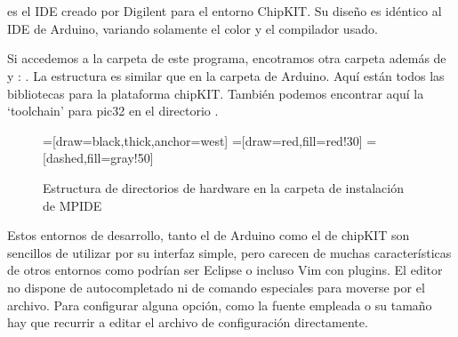 \section{}
\cite{website:mpide} es el IDE creado por Digilent para el entorno ChipKIT. Su diseño es idéntico al IDE de Arduino, variando solamente el color y el compilador usado.


Si accedemos a la carpeta  de este programa, encotramos otra carpeta además de  y : . La estructura es similar  que en la carpeta de Arduino. Aquí están todos las bibliotecas para la plataforma chipKIT. También podemos encontrar aquí la `toolchain'  para pic32 en el directorio .

\begin{figure}
\begin{center}
=[draw=black,thick,anchor=west]
=[draw=red,fill=red!30]
=[dashed,fill=gray!50]
\end{center}
\caption{Estructura de directorios de hardware en la carpeta de instalación de MPIDE}
\label{mpide_carpetas}
\end{figure}

Estos entornos de desarrollo, tanto el de Arduino como el de chipKIT son sencillos de utilizar por su interfaz simple, pero carecen de muchas características de otros entornos como podrían ser Eclipse o incluso Vim con plugins. El editor no dispone de autocompletado ni de comando especiales para moverse por el archivo. Para configurar alguna opción, como la fuente empleada o su tamaño hay que recurrir a editar el archivo de configuración directamente.

